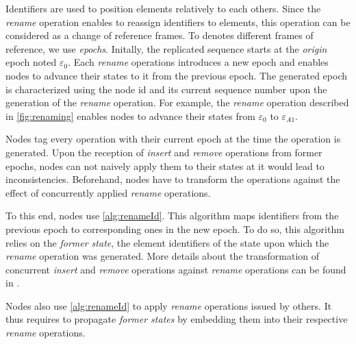 \documentclass[sigplan,10pt]{acmart}
\newcommand{\epoch}[1]{$\varepsilon_{#1}$}
\begin{document}
Identifiers are used to position elements relatively to each others.
Since the \emph{rename} operation enables to reassign identifiers to elements, this operation can be considered as a change of reference frames.
To denotes different frames of reference, we use \emph{epochs}.
Initally, the replicated sequence starts at the \emph{origin} epoch noted \epoch{0}.
Each \emph{rename} operations introduces a new epoch and enables nodes to advance their states to it from the previous epoch.
The generated epoch is characterized using the node id and its current sequence number upon the generation of the \emph{rename} operation.
For example, the \emph{rename} operation described in \autoref{fig:renaming} enables nodes to advance their states from \epoch{0} to \epoch{A1}.

Nodes tag every operation with their current epoch at the time the operation is generated.
Upon the reception of \emph{insert} and \emph{remove} operations from former epochs, nodes can not naively apply them to their states at it would lead to inconsistencies.
Beforehand, nodes have to transform the operations against the effect of concurrently applied \emph{rename} operations.

To this end, nodes use \autoref{alg:renameId}.
This algorithm maps identifiers from the previous epoch to corresponding ones in the new epoch.
To do so, this algorithm relies on the \emph{former state}, the element identifiers of the state upon which the \emph{rename} operation was generated.
More details about the transformation of concurrent \emph{insert} and \emph{remove} operations against \emph{rename} operations can be found in \cite{nicolas:hal-02526724}.

Nodes also use \autoref{alg:renameId} to apply \emph{rename} operations issued by others.
It thus requires to propagate \emph{former states} by embedding them into their respective \emph{rename} operations.
\end{document}
